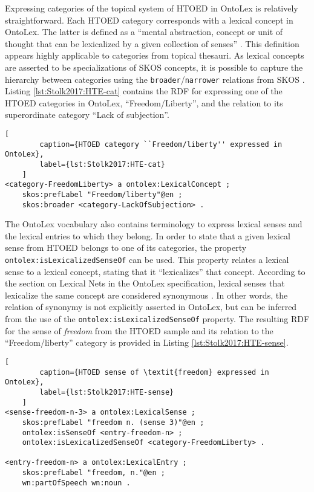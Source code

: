 Expressing categories of the topical system of HTOED in OntoLex is relatively straightforward. Each HTOED category corresponds with a lexical concept in OntoLex. The latter is defined as a ``mental abstraction, concept or unit of thought that can be lexicalized by a given collection of senses'' \cite{cimiano_lexicon_2016}. This definition appears highly applicable to categories from topical thesauri. As lexical concepts are asserted to be specializations of SKOS concepts, it is possible to capture the hierarchy between categories using the \texttt{broader}/\texttt{narrower} relations from SKOS \cite{miles_skos_2009}. Listing \ref{lst:Stolk2017:HTE-cat} contains the RDF for expressing one of the HTOED categories in OntoLex, ``Freedom/Liberty'', and the relation to its superordinate category ``Lack of subjection''.

\noindent
\begin{minipage}[c]{\textwidth}
	\begin{lstlisting}[
		caption={HTOED category ``Freedom/liberty'' expressed in OntoLex},
		label={lst:Stolk2017:HTE-cat}
	]
<category-FreedomLiberty> a ontolex:LexicalConcept ;
	skos:prefLabel "Freedom/liberty"@en ;
	skos:broader <category-LackOfSubjection> .
	\end{lstlisting}
\end{minipage}

The OntoLex vocabulary also contains terminology to express lexical senses and the lexical entries to which they belong. In order to state that a given lexical sense from HTOED belongs to one of its categories, the property \texttt{ontolex:isLexicalizedSenseOf} can be used. This property relates a lexical sense to a lexical concept, stating that it ``lexicalizes'' that concept. According to the section on Lexical Nets in the OntoLex specification, lexical senses that lexicalize the same concept are considered synonymous \cite{cimiano_lexicon_2016}. In other words, the relation of synonymy is not explicitly asserted in OntoLex, but can be inferred from the use of the \texttt{ontolex:isLexicalizedSenseOf} property. The resulting RDF for the sense of \textit{freedom} from the HTOED sample and its relation to the ``Freedom/liberty'' category is provided in Listing \ref{lst:Stolk2017:HTE-sense}.

\noindent
\begin{minipage}[c]{\textwidth}
	\begin{lstlisting}[
		caption={HTOED sense of \textit{freedom} expressed in OntoLex},
		label={lst:Stolk2017:HTE-sense}
	]
<sense-freedom-n-3> a ontolex:LexicalSense ;
	skos:prefLabel "freedom n. (sense 3)"@en ;
	ontolex:isSenseOf <entry-freedom-n> ;
	ontolex:isLexicalizedSenseOf <category-FreedomLiberty> .

<entry-freedom-n> a ontolex:LexicalEntry ;
	skos:prefLabel "freedom, n."@en ;
	wn:partOfSpeech wn:noun .
	\end{lstlisting}
\end{minipage}
 
